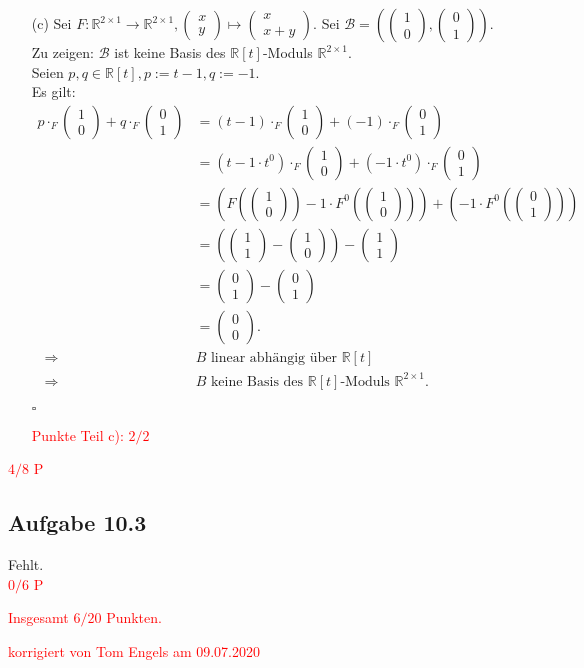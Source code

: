 \documentclass[12pt]{article}
\newcommand{\corr}[1]{\textcolor{red}{#1}}
\newcommand{\QED}{\begin{flushright} \mbox{$\square$} \end{flushright}}
\newcommand{\df}{\enspace\Longrightarrow\enspace}
\newcommand{\koeff}[2]{\begin{pmatrix}#1 \\ #2\end{pmatrix}}
\begin{document}
\begin{enumerate}
	\item[(c)] Sei $F:\mathbb{R}^{2\times1}\rightarrow\mathbb{R}^{2\times1},\koeff{x}{y}\mapsto\koeff{x}{x+y}$.
	Sei $\mathcal{B}=\left(\koeff{1}{0},\koeff{0}{1}\right)$. \\
	Zu zeigen: $\mathcal{B}$ ist keine Basis des $\mathbb{R}[t]$-Moduls $\mathbb{R}^{2\times1}$. \\
	Seien $p,q\in\mathbb{R}[t], p:=t-1,q:=-1$. \\
	Es gilt:
	\begin{align*}
		p\cdot_F\koeff{1}{0}+q\cdot_F\koeff{0}{1}&=(t-1)\cdot_F\koeff{1}{0}+(-1)\cdot_F\koeff{0}{1} \\
		&=(t-1\cdot t^0)\cdot_F\koeff{1}{0}+(-1\cdot t^0)\cdot_F\koeff{0}{1} \\
		&=\left(F(\koeff{1}{0})-1\cdot F^0(\koeff{1}{0})\right)+\left(-1\cdot F^0(\koeff{0}{1})\right) \\
		&=\left(\koeff{1}{1}-\koeff{1}{0}\right)-\koeff{1}{1} \\
		&=\koeff{0}{1}-\koeff{0}{1} \\
		&=\koeff{0}{0}. \\
		\df&B\text{ linear abhängig über }\mathbb{R}[t] \\
		\df&B\text{ keine Basis des }\mathbb{R}[t]\text{-Moduls }\mathbb{R}^{2\times1}.
	\end{align*}
	\QED
\corr{Punkte Teil c): $2/2$}
\end{enumerate}
\corr{$4/8$ P}

\subsection*{Aufgabe 10.3}
Fehlt.\\
\corr{$0/6$ P}

\bigskip

\corr{Insgesamt $6/20$ Punkten.}


\bigskip

\corr{korrigiert von Tom Engels am 09.07.2020}
\end{document}
